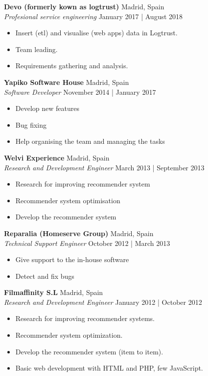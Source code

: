 \documentclass[a4paper]{article}
\begin{document}
\textbf{Devo (formerly kown as logtrust)} \hfill Madrid, Spain\\
\textit{Profesional service engineering} \hfill January 2017 | August 2018\\
\vspace{-1mm}
\begin{itemize} \itemsep 1pt
	\item Insert (etl) and visualise (web apps) data in Logtrust.
	\item Team leading.
	\item Requirements gathering and analysis.
\end{itemize}

\textbf{Yapiko Software House} \hfill Madrid, Spain\\
\textit{Software Developer} \hfill November 2014 | January 2017\\
\vspace{-1mm}
\begin{itemize} \itemsep 1pt
	\item Develop new features
	\item Bug fixing
	\item Help organising the team and managing the tasks
\end{itemize}

\textbf{Welvi Experience} \hfill Madrid, Spain\\
\textit{Research and Development Engineer} \hfill March 2013 | September 2013\\
\vspace{-1mm}
\begin{itemize} \itemsep 1pt
	\item Research for improving recommender system
	\item Recommender system optimisation
	\item Develop the recommender system
\end{itemize}

\textbf{Reparalia (Homeserve Group)} \hfill Madrid, Spain\\
\textit{Technical Support Engineer} \hfill October 2012 | March 2013\\
\vspace{-1mm}
\begin{itemize} \itemsep 1pt
	\item Give support to the in-house software
	\item Detect and fix bugs
\end{itemize}

\textbf{Filmaffinity S.L} \hfill Madrid, Spain\\
\textit{Research and Development Engineer} \hfill January 2012 | October 2012\\
\vspace{-1mm}
\begin{itemize} \itemsep 1pt
	\item Research for improving recommender systems.
	\item Recommender system optimization.
	\item Develop the recommender system (item to item).
	\item Basic web development with HTML and PHP, few JavaScript.
\end{itemize}
\end{document}
